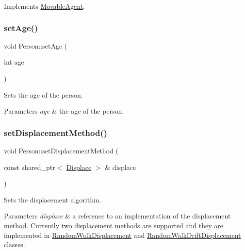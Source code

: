Implements \mbox{\hyperlink{class_movable_agent_a88b617f0e78c817634e5b587da045ab0}{Movable\+Agent}}.

\mbox{\label{class_person_ac8ade54c27a0657c987c395ff04a9d46}} 
\subsubsection{\texorpdfstring{setAge()}{setAge()}}
{\footnotesize\ttfamily void Person\+::set\+Age (\begin{DoxyParamCaption}\item[{int}]{age }\end{DoxyParamCaption})}

Sets the age of the person. 
\begin{DoxyParams}{Parameters}
{\em age} & the age of the person. \\
\hline
\end{DoxyParams}
\mbox{\label{class_person_a89ada26d3541bc82e514dae833dc959d}} 
\subsubsection{\texorpdfstring{setDisplacementMethod()}{setDisplacementMethod()}}
{\footnotesize\ttfamily void Person\+::set\+Displacement\+Method (\begin{DoxyParamCaption}\item[{const shared\+\_\+ptr$<$ \mbox{\hyperlink{class_displace}{Displace}} $>$ \&}]{displace }\end{DoxyParamCaption})}

Sets the displacement algorithm. 
\begin{DoxyParams}{Parameters}
{\em displace} & a reference to an implementation of the displacement method. Currently two displacement methods are supported and they are implemented in \mbox{\hyperlink{class_random_walk_displacement}{Random\+Walk\+Displacement}} and \mbox{\hyperlink{class_random_walk_drift_displacement}{Random\+Walk\+Drift\+Displacement}} classes. \\
\hline
\end{DoxyParams}
\mbox{\label{class_person_a05f4ac2107d59e03f0f336eda08aa358}} 
